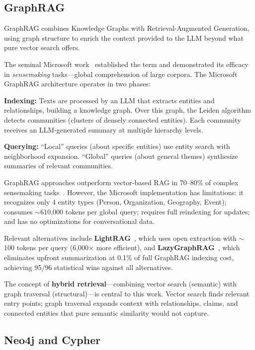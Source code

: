\subsection{GraphRAG}

GraphRAG combines Knowledge Graphs with Retrieval-Augmented Generation, using graph structure to enrich the context provided to the LLM beyond what pure vector search offers.

The seminal Microsoft work~\cite{edge2024graphrag} established the term and demonstrated its efficacy in \textit{sensemaking} tasks---global comprehension of large corpora. The Microsoft GraphRAG architecture operates in two phases:

\textbf{Indexing:} Texts are processed by an LLM that extracts entities and relationships, building a knowledge graph. Over this graph, the Leiden algorithm detects communities (clusters of densely connected entities). Each community receives an LLM-generated summary at multiple hierarchy levels.

\textbf{Querying:} ``Local'' queries (about specific entities) use entity search with neighborhood expansion. ``Global'' queries (about general themes) synthesize summaries of relevant communities.

GraphRAG approaches outperform vector-based RAG in 70--80\% of complex sensemaking tasks~\cite{edge2024graphrag}. However, the Microsoft implementation has limitations: it recognizes only 4 entity types (Person, Organization, Geography, Event); consumes $\sim$610,000 tokens per global query; requires full reindexing for updates; and has no optimizations for conversational data.

Relevant alternatives include \textbf{LightRAG}~\cite{guo2024lightrag}, which uses open extraction with $\sim$100 tokens per query (6,000$\times$ more efficient), and \textbf{LazyGraphRAG}~\cite{edge2024lazygraphrag}, which eliminates upfront summarization at 0.1\% of full GraphRAG indexing cost, achieving 95/96 statistical wins against all alternatives.

The concept of \textbf{hybrid retrieval}---combining vector search (semantic) with graph traversal (structural)---is central to this work. Vector search finds relevant entry points; graph traversal expands context with relationships, claims, and connected entities that pure semantic similarity would not capture.

\subsection{Neo4j and Cypher}

